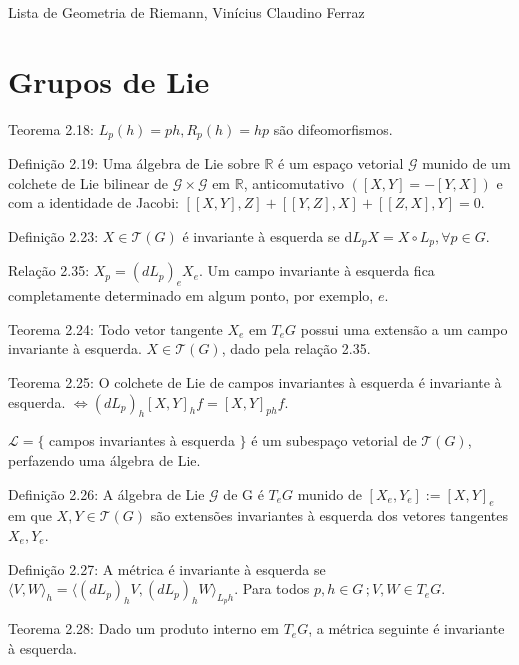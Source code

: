 \documentclass[10pt,a4paper]{article}
\begin{document}
	\Large

	\begin{center}
		Lista de Geometria de Riemann, Vin\'icius Claudino Ferraz
	\end{center}

	\normalsize

	\section{Grupos de Lie}
		\begin{flushright}
		\end{flushright}

		Teorema 2.18: $L_p(h) = ph, R_p(h) = hp$ s\~ao difeomorfismos.

		Defini\c{c}\~ao 2.19: Uma \'algebra de Lie sobre $\mathbb{R}$ \'e um espa\c{c}o vetorial $\mathcal{G}$ munido de um colchete de Lie bilinear de $\mathcal{G} \times \mathcal{G}$ em $\mathbb{R}$, anticomutativo $([X,Y] = -[Y,X])$ e com a identidade de Jacobi: $[[X,Y], Z] + [[Y,Z],X] + [[Z,X],Y] = 0$.

		Defini\c{c}\~ao 2.23: $X \in \mathcal{T}(G)$ \'e invariante \`a esquerda se d$L_p X = X \circ L_p, \forall p \in G$.

		Rela\c{c}\~ao 2.35: $X_p = (dL_p)_e X_e$. Um campo invariante \`a esquerda fica completamente determinado em algum ponto, por exemplo, $e$.

		Teorema 2.24: Todo vetor tangente $X_e$ em $T_eG$ possui uma extens\~ao a um campo invariante \`a esquerda. $X \in \mathcal{T}(G)$, dado pela rela\c{c}\~ao 2.35.

		Teorema 2.25: O colchete de Lie de campos invariantes \`a esquerda \'e invariante \`a esquerda. $\Leftrightarrow (dL_p)_h [X,Y]_h f = [X,Y]_{ph} f$.

		$\mathcal{L} = \{$ campos invariantes \`a esquerda $\}$ \'e um subespa\c{c}o vetorial de $\mathcal{T}(G)$, perfazendo uma \'algebra de Lie.

		Defini\c{c}\~ao 2.26: A \'algebra de Lie $\mathcal{G}$ de G \'e $T_eG$ munido de $[X_e, Y_e] := [X,Y]_e$ em que $X, Y \in \mathcal{T}(G)$ s\~ao extens\~oes invariantes \`a esquerda dos vetores tangentes $X_e, Y_e$.

		Defini\c{c}\~ao 2.27: A m\'etrica \'e invariante \`a esquerda se $\langle V, W \rangle_h = \langle (dL_p)_h V, (dL_p)_h W \rangle_{L_p h}$. Para todos $p,h \in G\,; V, W \in T_eG$.

		Teorema 2.28: Dado um produto interno em $T_eG$, a m\'etrica seguinte \'e invariante \`a esquerda.
\end{document}
